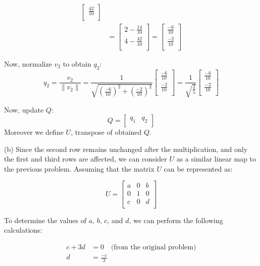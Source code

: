 \documentclass{article}
\begin{document}
\begin{enumerate}[leftmargin=\labelsep]
\begin{align*}
\begin{bmatrix}
\frac{42}{10} \\
\end{bmatrix} \\
&= \begin{bmatrix}
2 - \frac{14}{10} \\
4 - \frac{42}{10} \\
\end{bmatrix} = \begin{bmatrix}
	\frac{-6}{10} \\
	\frac{-2}{10} \\
	\end{bmatrix}
\end{align*}

Now, normalize $v_2$ to obtain $q_2$:
\[
q_2 = \frac{v_2}{\|v_2\|} = \frac{1}{\sqrt{\left(\frac{-6}{10}\right)^2 + \left(\frac{-2}{10}\right)^2}} \begin{bmatrix}
	\frac{-6}{10} \\
	\frac{-2}{10} \\
\end{bmatrix} = \frac{1}{\sqrt{\frac{2}{5}}}\begin{bmatrix}
	\frac{-6}{10} \\
	\frac{-2}{10} \\
	\end{bmatrix}
\]

Now, update $Q$:
\[
Q = \begin{bmatrix}
q_1 & q_2 \\
\end{bmatrix}
\]
Moreover we define $U$, transpose of obtained $Q$.

(b) Since the second row remains unchanged after the multiplication, and only the first and third rows are affected, we can consider $U$ as a similar linear map to the previous problem. Assuming that the matrix $U$ can be represented as:

\[
U = \begin{bmatrix}
a & 0 & b \\
0 & 1 & 0 \\
c & 0 & d \\
\end{bmatrix}
\]

To determine the values of $a$, $b$, $c$, and $d$, we can perform the following calculations:

\begin{align*}
c + 3d &= 0 \quad \text{(from the original problem)} \\
d &= \frac{-c}{3}
\end{align*}


\end{enumerate}
\end{document}
